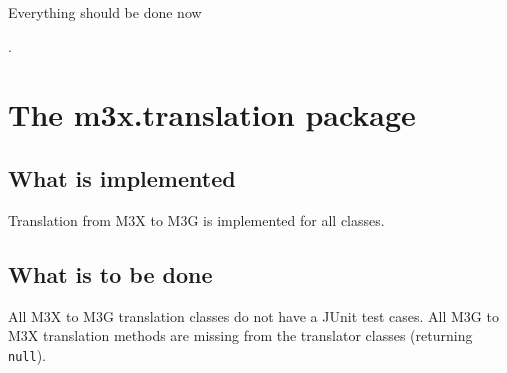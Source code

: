 \documentclass[a4paper,twoside]{article}
\begin{document}
Everything should be done now \date{\today}.

\section{The m3x.translation package}

\subsection{What is implemented}

Translation from M3X to M3G is implemented for all classes.

\subsection{What is to be done}

All M3X to M3G translation classes do not have a JUnit test cases.
All M3G to M3X translation methods are missing from the translator classes
(returning \texttt{null}).
\end{document}
